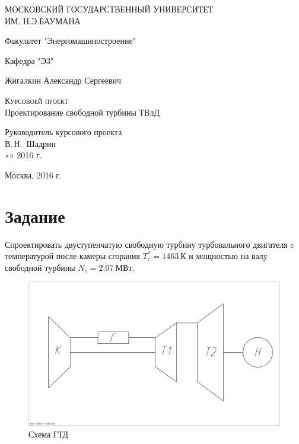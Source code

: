\documentclass[a4paper,10pt]{article}
\begin{document}
\begin{titlepage}
  \begin{center}
    МОСКОВСКИЙ ГОСУДАРСТВЕННЫЙ УНИВЕРСИТЕТ \\ ИМ. Н.Э.БАУМАНА
    \vspace{0.25cm}
    
    Факультет "Энергомашиностроение"
    
    Кафедра "Э3"
    \vfill
    
    
    Жигалкин Александр Сергеевич
    \vfill

    \textsc{Курсовоей проект}\\[5mm]
    
    {\LARGE Проектирование свободной турбины ТВлД}
\end{center}
\vfill

\newlength{\ML}
\hfill\begin{minipage}{0.4\textwidth}
  Руководитель курсового проекта\\
  \underline{\hspace{\ML}} В.\,Н.~Шадрин\\
  «\underline{\hspace{0.7cm}}» \underline{\hspace{2cm}} 2016 г.
\end{minipage}%
\bigskip

\vfill

\begin{center}
  Москва, 2016 г.
\end{center}
\end{titlepage}

\section{Задание}

Спроектировать двуступенчатую свободную турбину турбовального двигателя c температурой после камеры сгорания $T_г^*=1463\ К$ и мощностью на валу свободной турбины $N_e=2.07\ МВт$. 

\begin{figure}[hbtp]
\centering
\includegraphics[scale=0.2]{../scheme.png}
\caption{Схема ГТД}
\end{figure}
\end{document}
